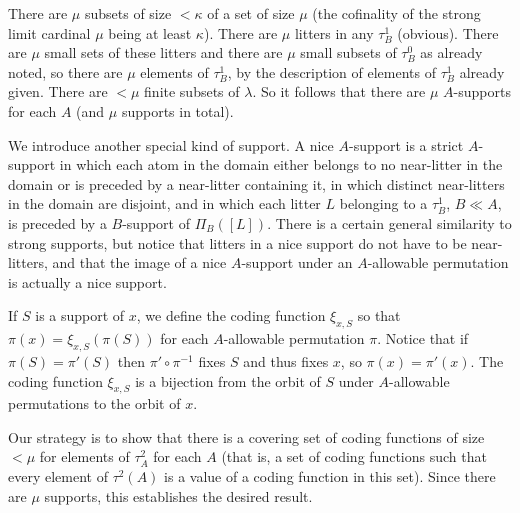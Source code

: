 \documentclass{slides}
\begin{document}
\begin{slide}

There are $\mu$ subsets of size $<\kappa$ of a set of size $\mu$ (the cofinality of the strong limit cardinal $\mu$ being at least $\kappa$).  There are $\mu$ litters
in any $\tau^1_B$ (obvious).  There are $\mu$ small sets of these litters and there are $\mu$ small subsets of $\tau^0_B$ as already noted, so there are $\mu$ elements of
$\tau^1_B$, by the description of elements of $\tau^1_B$ already given.  There are $<\mu$ finite subsets of $\lambda$.  So it follows that there are $\mu$ $A$-supports
for each $A$ (and $\mu$ supports in total).

\end{slide}

\begin{slide}

We introduce another special kind of support.  A nice $A$-support is a strict $A$-support in which each atom in the domain either belongs to no near-litter in the domain
or is preceded by a near-litter containing it, in which distinct near-litters in the domain are disjoint, and in which each litter $L$ belonging to a $\tau^1_B$, $B \ll A$, is preceded by a $B$-support of $\Pi_B([L])$.  There is a certain general similarity to strong supports, but notice that litters in a nice support do not have to be near-litters, and that the image of a nice $A$-support under an $A$-allowable permutation is actually a nice support.

\end{slide}

\begin{slide}


If $S$ is a support of $x$, we define the coding function $\xi_{x,S}$ so that $\pi(x) = \xi_{x,S}(\pi(S))$ for each $A$-allowable permutation $\pi$.  Notice that if $\pi(S)=\pi'(S)$ then $\pi'\circ \pi^{-1}$ fixes $S$ and thus fixes $x$, so $\pi(x) = \pi'(x)$.  The coding function $\xi_{x,S}$  is a bijection from the orbit of $S$ under $A$-allowable permutations to the orbit of $x$.

Our strategy is to show that there is a covering set of coding functions of size $<\mu$ for elements of $\tau^2_A$  for each $A$ (that is, a set of coding functions
such that every element of $\tau^2(A)$ is a value of a coding function in this set).  Since there are $\mu$ supports, this establishes the desired result.

\end{slide}
\end{document}
